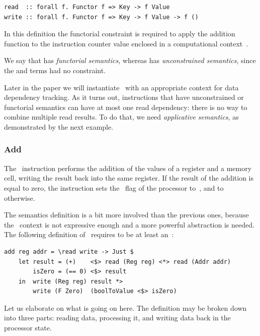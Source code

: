 \begin{verbatim}
read  :: forall f. Functor f => Key -> f Value
write :: forall f. Functor f => Key -> f Value -> f ()
\end{verbatim}

In this definition the functorial constraint is required to apply the addition
function  to the instruction counter value
enclosed in a computational context~.

We say that  has \emph{functorial semantics}, whereas  has
\emph{unconstrained semantics}, since the  and  terms had
no constraint.

Later in the paper we will instantiate~ with an appropriate context for
data dependency tracking. As it turns out, instructions that have unconstrained
or functorial semantics can have at most one read dependency: there is no way
to combine multiple read results. To do that, we need \emph{applicative
semantics}, as demonstrated by the next example.

\subsubsection{Add}

The~ instruction performs the addition of the values of a register and
a memory cell, writing the result back into the same register. If the result of
the addition is equal to zero, the instruction sets the~ flag of the
processor to~, and to~ otherwise.

The semantics definition is a bit more involved than the previous ones, because
the~ context is not expressive enough and a more powerful
abstraction is needed. The following definition of~ requires
 to be at least an~:

\begin{verbatim}
add reg addr = \read write -> Just $
    let result = (+)    <$> read (Reg reg) <*> read (Addr addr)
        isZero = (== 0) <$> result
    in  write (Reg reg) result *>
        write (F Zero)  (boolToValue <$> isZero)
\end{verbatim}

\noindent
Let us elaborate on what is going on here. The definition may be broken down
into three parts: reading data, processing it, and writing data back in the
processor state.

